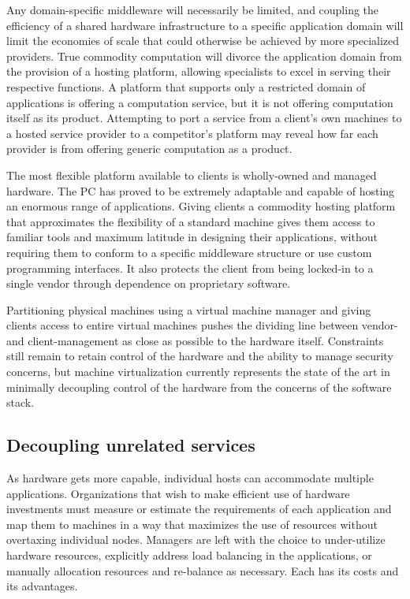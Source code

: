 Any domain-specific middleware will necessarily be limited, and coupling the efficiency of a shared hardware infrastructure to a specific application domain will limit the economies of scale that could otherwise be achieved by more specialized providers. True commodity computation will divorce the application domain from the provision of a hosting platform, allowing specialists to excel in serving their respective functions. A platform that supports only a restricted domain of applications is offering a computation service, but it is not offering computation itself as its product. Attempting to port a service from a client's own machines to a hosted service provider to a competitor's platform may reveal how far each provider is from offering generic computation as a product.

The most flexible platform available to clients is wholly-owned and managed hardware. The PC has proved to be extremely adaptable and capable of hosting an enormous range of applications. Giving clients a commodity hosting platform that approximates the flexibility of a standard machine gives them access to familiar tools and maximum latitude in designing their applications, without requiring them to conform to a specific middleware structure or use custom programming interfaces. It also protects the client from being locked-in to a single vendor through dependence on proprietary software.

Partitioning physical machines using a virtual machine manager and giving clients access to entire virtual machines pushes the dividing line between vendor- and client-management as close as possible to the hardware itself. Constraints still remain to retain control of the hardware and the ability to manage security concerns, but machine virtualization currently represents the state of the art in minimally decoupling control of the hardware from the concerns of the software stack.

\subsection{Decoupling unrelated services}

As hardware gets more capable, individual hosts can accommodate multiple applications. Organizations that wish to make efficient use of hardware investments must measure or estimate the requirements of each application and map them to machines in a way that maximizes the use of resources without overtaxing individual nodes. Managers are left with the choice to under-utilize hardware resources, explicitly address load balancing in the applications, or manually allocation resources and re-balance as necessary. Each has its costs and its advantages.

